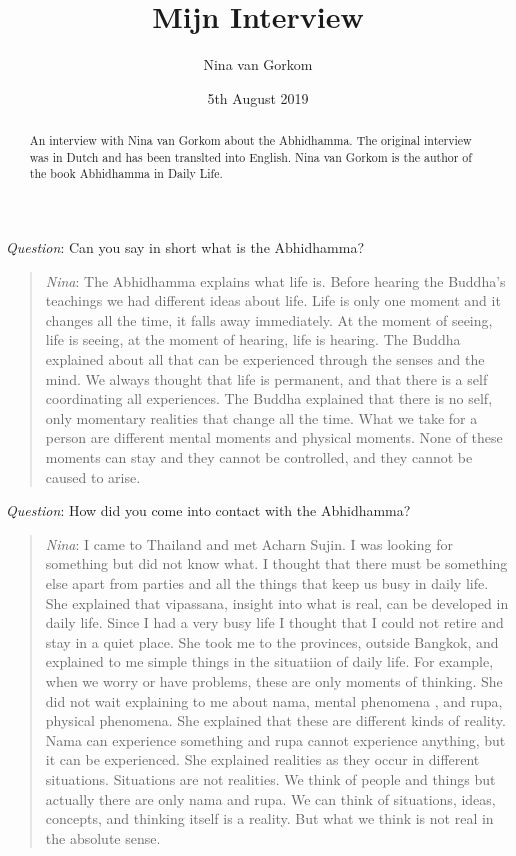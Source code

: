 \documentclass[10pt,a4paper,oneside]{article}
\title{Mijn Interview}
\author{Nina van Gorkom}
\date{5th August 2019}
\begin{document}
\maketitle
\begin{abstract}
An interview with Nina van Gorkom about the Abhidhamma. The original interview was in Dutch and has been translted into English. Nina van Gorkom is the author of the book Abhidhamma in Daily Life.
\end{abstract}



\textit{Question}: Can you say in short what is the Abhidhamma?

\begin{quote}

\textit{Nina}: The Abhidhamma explains what life is. Before hearing the Buddha’s teachings we had different ideas about life. Life is only one moment and it changes all the time, it falls away immediately. At the moment of seeing, life is seeing, at the moment of hearing, life is hearing. The Buddha explained about all that can be experienced through the senses and the mind.
We always thought that life is permanent, and that there is a self coordinating all experiences. The Buddha explained that there is no self, only momentary realities that change all the time. What we take for a person are different mental moments and physical moments. None of these moments can stay and they cannot be controlled, and they cannot be caused to arise.
\end{quote}

\textit{Question}: How did you come into contact with the Abhidhamma?

\begin{quote}


\textit{Nina}: I came to Thailand and met Acharn Sujin. I was looking for something but did not know what. I thought that there must be something else apart from parties and all the things that keep us busy in daily life. She explained that vipassana, insight into what is real, can be developed in daily life. Since I had a very busy life I thought that I could not retire and stay in a quiet place. She took me to the provinces, outside Bangkok, and explained to me simple things in the situatiion of daily life. For example, when we worry or have problems, these are only moments of thinking. She did not wait explaining to me about nama, mental phenomena , and rupa, physical phenomena. She explained that these are different kinds of reality. Nama can experience something and rupa cannot experience anything, but it can be experienced. She explained realities as they occur in different situations. Situations are not realities. We think of people and things but actually there are only nama and rupa. We can think of situations, ideas, concepts, and thinking itself is a reality. But what we think is not real in the absolute sense.

\end{quote}
\end{document}
